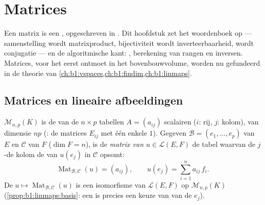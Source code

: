 \chapter{Matrices}\label{ch:b1:matrices}

Een matrix is een , opgeschreven in .
Dit hoofdstuk zet het woordenboek op --- samenstelling wordt
matrixproduct, bijectiviteit wordt inverteerbaarheid,
 wordt conjugatie --- en de algoritmische kant:
, berekening van rangen en inversen. Matrices, voor het
eerst ontmoet in het bovenbouwvolume, worden nu gefundeerd in de
theorie van
\cref{ch:b1:vspaces,ch:b1:findim,ch:b1:linmaps}.

\section{Matrices en lineaire afbeeldingen}

\begin{definition}\label{def:b1:matrices:def}
$\mathcal{M}_{n,p}(K)$ is de  van de $n \times p$
tabellen $A = (a_{ij})$ scalairen ($i$: rij, $j$: kolom), van
dimensie $np$ (: de matrices $E_{ij}$ met één enkele $1$).
Gegeven  $\mathcal{B} = (e_1, \dots, e_p)$ van $E$ en
$\mathcal{C}$ van $F$ ($\dim F = n$), is de \emph{matrix van $u \in
\mathcal{L}(E, F)$} de tabel waarvan de $j$-de kolom de 
van $u(e_j)$ in $\mathcal{C}$ opsomt:
\[
\operatorname{Mat}_{\mathcal{B},\mathcal{C}}(u) = (a_{ij}),
\qquad u(e_j) = \sum_{i=1}^{n} a_{ij}\, f_i .
\]
De  $u \mapsto
\operatorname{Mat}_{\mathcal{B},\mathcal{C}}(u)$ is een isomorfisme
van $\mathcal{L}(E, F)$ op $\mathcal{M}_{n,p}(K)$
(\cref{prop:b1:linmaps:basis}: een  is precies
een keuze van  van de $e_j$).
\end{definition}


